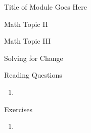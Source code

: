 \documentclass[oneside,10pt]{book}
\begin{document}
\begin{chapter}{Title of Module Goes Here}
\begin{section}{Math Topic II}
\label{module-tag-math-topic-2}
\end{section}

\begin{section}{Math Topic III}
\label{module-tag-math-topic-3}
\end{section}

\begin{section}{Solving for Change}
\label{module-tag-solving-for-change}
\end{section}

\begin{section}{Reading Questions}
\label{module-tag-reading-questions}
\begin{enumerate}
\item 
\end{enumerate}
\end{section}

\begin{section}{Exercises}
\label{module-tag-exercises}
\begin{enumerate}
\item 
\end{enumerate}
\end{section}


\end{chapter}
\end{document}
